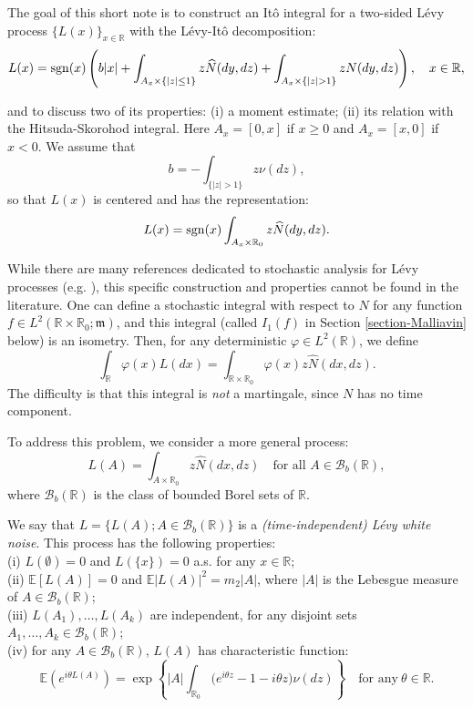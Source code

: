 \documentclass[12pt]{article}
\def\cB{\mathcal{B}}
\def\bE{\mathbb{E}}
\def\bR{\mathbb{R}}
\newcommand{\fm}{\mathfrak{m}}
\begin{document}
The goal of this short note is to construct an It\^o integral for a two-sided L\'evy process $\{L(x) \}_{x \in \bR}$ with the L\'evy-It\^o decomposition:
\[
L(x)={\rm sgn}(x) \left(b|x|+\int_{A_x\times \{|z| \leq 1\}} z \widehat{N}(dy,dz)+\int_{A_x \times \{|z|>1\}}z N(dy,dz)\right), \quad x\in \bR,
\]

and to discuss two of its properties: (i) a moment estimate; (ii) its relation with the Hitsuda-Skorohod integral. 
Here $A_x=[0,x]$ if $x \geq 0$ and $A_x=[x,0]$ if $x<0$.  
We assume that 
\[
b=-\int_{\{|z|>1\}} z\nu(dz),
\]
so that $L(x)$ is centered and has the representation:
\[
L(x)={\rm sgn}(x)\int_{A_x \times \bR_0}z \widehat{N}(dy,dz).
\]

While there are many references dedicated to stochastic analysis for L\'evy processes (e.g. \cite{applebaum09,BGJ87,DOP09,last16,NN,PZ07}), this specific construction and properties cannot be found in the literature. One can define a stochastic integral with respect to $\widehat{N}$ for any function  $f \in L^2(\bR \times \bR_0;\fm)$, and this integral (called $I_1(f)$ in Section \ref{section-Malliavin} below) is an isometry. Then, for any deterministic $\varphi \in L^2(\bR)$, we define 
\[
\int_{\bR} \varphi(x) L(dx)=\int_{\bR \times \bR_0} \varphi(x) z \widehat{N}(dx,dz).
\]
 The difficulty is that this integral is {\em not} a martingale, since $N$ has no time component.


\medskip

To address this problem, we consider a more general process:
\begin{equation}
\label{def-L}
L(A)=\int_{A \times \bR_0}z \widehat{N}(dx,dz) \quad \mbox{for all $A \in \cB_b(\bR)$},
\end{equation}
where $\cB_b(\bR)$ is the class of bounded Borel sets of $\bR$. 

\medskip

We say that $L=\{L(A);A \in \cB_b(\bR)\}$ is a {\em (time-independent) L\'evy white noise}. This process has the following properties: \\
(i) $L(\emptyset)=0$ and $L(\{x\})=0$ a.s. for any $x \in \bR$;\\
(ii) $\bE[L(A)]=0$ and $\bE|L(A)|^2=m_2|A|$, 
where $|A|$ is the Lebesgue measure of $A\in \cB_b(\bR)$; \\
(iii) $L(A_1),\ldots, L(A_k)$ are independent, for any disjoint sets $A_1,\ldots,A_k \in \cB_b(\bR)$;\\
(iv) for any $A \in \cB_b(\bR)$, $L(A)$ has characteristic function:
\begin{equation}
\label{ch-funct-L}
\bE(e^{i\theta L(A)})=\exp\left\{ |A| \int_{\bR_0} \big(e^{i\theta z}-1-i\theta z\big) \nu(dz) \right\} \quad \mbox{for any} \ \theta \in  \bR.
\end{equation}
\end{document}

